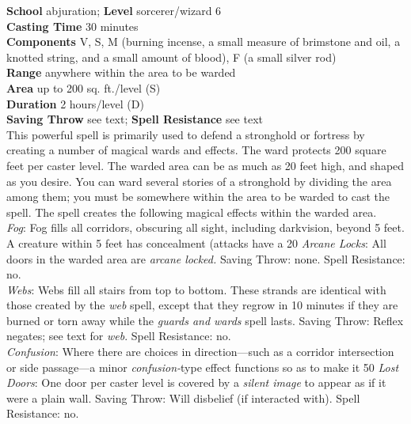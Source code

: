 \textbf{School} abjuration; \textbf{Level} sorcerer/wizard 6\\
\textbf{Casting Time} 30 minutes\\
\textbf{Components} V, S, M (burning incense, a small measure of brimstone and oil, a knotted string, and a small amount of blood), F (a small silver rod)\\
\textbf{Range} anywhere within the area to be warded\\
\textbf{Area} up to 200 sq. ft./level (S)\\
\textbf{Duration} 2 hours/level (D)\\
\textbf{Saving Throw} see text; \textbf{Spell Resistance} see text\\
This powerful spell is primarily used to defend a stronghold or fortress by creating a number of magical wards and effects. The ward protects 200 square feet per caster level. The warded area can be as much as 20 feet high, and shaped as you desire. You can ward several stories of a stronghold by dividing the area among them; you must be somewhere within the area to be warded to cast the spell. The spell creates the following magical effects within the warded area.\\
\textit{Fog}: Fog fills all corridors, obscuring all sight, including darkvision, beyond 5 feet. A creature within 5 feet has concealment (attacks have a 20%
\textit{Arcane Locks}: All doors in the warded area are \textit{arcane locked. }Saving Throw: none. Spell Resistance: no.\\
\textit{Webs}: Webs fill all stairs from top to bottom. These strands are identical with those created by the \textit{web }spell, except that they regrow in 10 minutes if they are burned or torn away while the \textit{guards and wards }spell lasts. Saving Throw: Reflex negates; see text for \textit{web}. Spell Resistance: no.\\
\textit{Confusion}: Where there are choices in direction—such as a corridor intersection or side passage—a minor \textit{confusion-}type effect functions so as to make it 50%
\textit{Lost Doors}: One door per caster level is covered by a \textit{silent image }to appear as if it were a plain wall. Saving Throw: Will disbelief (if interacted with). Spell Resistance: no.\\

